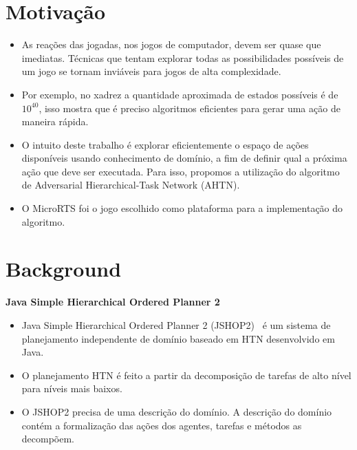 \documentclass[a0,portrait]{a0poster}
\newcommand\itemadjust{\itemsep.5em \parskip0pt \parsep0pt}
\begin{document}
\begin{multicols}{2} 
	\color{NavyBlue}
	\color{Black}
	\raggedright
	\Large
	\color{NavyBlue}
	\section*{\huge Motiva\c{c}\~ao}
	\color{Black}
	
	\begin{itemize}
		\item As reações das jogadas, nos jogos de computador, devem ser quase que imediatas. Técnicas que tentam explorar todas as possibilidades possíveis de um jogo se tornam inviáveis para jogos de alta complexidade.
		\item Por exemplo, no xadrez a quantidade aproximada de estados possíveis é de $10^{40}$, isso mostra que é preciso algoritmos eficientes para gerar uma ação de maneira rápida. 
		\item O intuito deste trabalho é explorar eficientemente o espaço de ações disponíveis usando conhecimento de domínio, a fim de definir qual a próxima ação que deve ser executada. Para isso, propomos a utilização do algoritmo de Adversarial Hierarchical-Task Network (AHTN).
		\item O MicroRTS foi o jogo escolhido como plataforma para a implementação do algoritmo.
	\end{itemize}
	
	\color{NavyBlue}
	\section*{\huge Background}
	\color{Black}
	
	\textbf{Java Simple Hierarchical Ordered Planner 2}
	\begin{itemize}
		\item Java Simple Hierarchical Ordered Planner 2 (JSHOP2)~\cite{ilghami2006documentation} é um sistema de planejamento independente de domínio baseado em HTN desenvolvido em Java.
		\item O planejamento HTN é feito a partir da decomposição de tarefas de alto nível para níveis mais baixos. 
		\item O JSHOP2 precisa de uma descrição do domínio. A descrição do domínio contém a formalização das ações dos agentes, tarefas e métodos as decompõem.
	\end{itemize}
		

\end{multicols}
\end{document}
